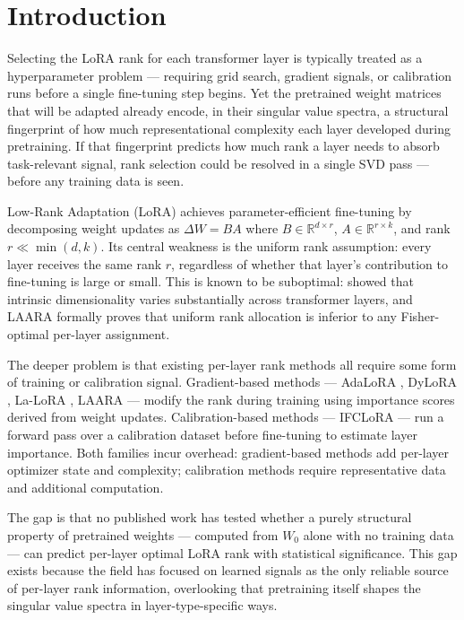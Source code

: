 \section{Introduction}
\label{sec:introduction}

Selecting the LoRA rank for each transformer layer is typically treated as a hyperparameter problem --- requiring grid search, gradient signals, or calibration runs before a single fine-tuning step begins. Yet the pretrained weight matrices that will be adapted already encode, in their singular value spectra, a structural fingerprint of how much representational complexity each layer developed during pretraining. If that fingerprint predicts how much rank a layer needs to absorb task-relevant signal, rank selection could be resolved in a single SVD pass --- before any training data is seen.

Low-Rank Adaptation (LoRA) \cite{Hu2022LoRA} achieves parameter-efficient fine-tuning by decomposing weight updates as $\Delta W = BA$ where $B \in \mathbb{R}^{d \times r}$, $A \in \mathbb{R}^{r \times k}$, and rank $r \ll \min(d,k)$. Its central weakness is the uniform rank assumption: every layer receives the same rank $r$, regardless of whether that layer's contribution to fine-tuning is large or small. This is known to be suboptimal: \citet{Aghajanyan2021Intrinsic} showed that intrinsic dimensionality varies substantially across transformer layers, and LAARA \cite{Tripathi2026LAARA} formally proves that uniform rank allocation is inferior to any Fisher-optimal per-layer assignment.

The deeper problem is that existing per-layer rank methods all require some form of training or calibration signal. Gradient-based methods --- AdaLoRA \cite{Zhang2023AdaLoRA}, DyLoRA \cite{Valipour2022DyLoRA}, La-LoRA \cite{Chen2025LaLoRA}, LAARA \cite{Tripathi2026LAARA} --- modify the rank during training using importance scores derived from weight updates. Calibration-based methods --- IFCLoRA \cite{Zhang2026IFCLoRA} --- run a forward pass over a calibration dataset before fine-tuning to estimate layer importance. Both families incur overhead: gradient-based methods add per-layer optimizer state and complexity; calibration methods require representative data and additional computation.

The gap is that no published work has tested whether a purely structural property of pretrained weights --- computed from $W_0$ alone with no training data --- can predict per-layer optimal LoRA rank with statistical significance. This gap exists because the field has focused on learned signals as the only reliable source of per-layer rank information, overlooking that pretraining itself shapes the singular value spectra in layer-type-specific ways.

